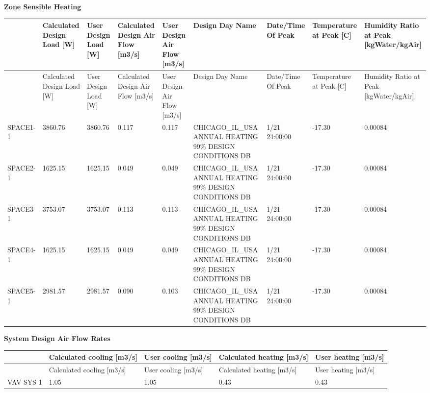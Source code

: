 \textbf{Zone Sensible Heating}

{\scriptsize
\begin{longtable}[c]{>{\raggedright}p{0.66in}>{\raggedright}p{0.66in}>{\raggedright}p{0.66in}>{\raggedright}p{0.66in}>{\raggedright}p{0.66in}>{\raggedright}p{0.66in}>{\raggedright}p{0.66in}>{\raggedright}p{0.66in}>{\raggedright}p{0.66in}}
\toprule 
 & Calculated Design Load [W] & User Design Load [W] & Calculated Design Air Flow [m3/s] & User Design Air Flow [m3/s] & Design Day Name & Date/Time Of Peak & Temperature at Peak [C] & Humidity Ratio at Peak [kgWater/kgAir] \tabularnewline
\midrule
\endfirsthead

\toprule 
 & Calculated Design Load [W] & User Design Load [W] & Calculated Design Air Flow [m3/s] & User Design Air Flow [m3/s] & Design Day Name & Date/Time Of Peak & Temperature at Peak [C] & Humidity Ratio at Peak [kgWater/kgAir] \tabularnewline
\midrule
\endhead

SPACE1-1 & 3860.76 & 3860.76 & 0.117 & 0.117 & CHICAGO\-\_IL\-\_USA ANNUAL HEATING 99\% DESIGN CONDITIONS DB & 1/21 24:00:00 & -17.30 & 0.00084 \tabularnewline
SPACE2-1 & 1625.15 & 1625.15 & 0.049 & 0.049 & CHICAGO\-\_IL\-\_USA ANNUAL HEATING 99\% DESIGN CONDITIONS DB & 1/21 24:00:00 & -17.30 & 0.00084 \tabularnewline
SPACE3-1 & 3753.07 & 3753.07 & 0.113 & 0.113 & CHICAGO\-\_IL\-\_USA ANNUAL HEATING 99\% DESIGN CONDITIONS DB & 1/21 24:00:00 & -17.30 & 0.00084 \tabularnewline
SPACE4-1 & 1625.15 & 1625.15 & 0.049 & 0.049 & CHICAGO\-\_IL\-\_USA ANNUAL HEATING 99\% DESIGN CONDITIONS DB & 1/21 24:00:00 & -17.30 & 0.00084 \tabularnewline
SPACE5-1 & 2981.57 & 2981.57 & 0.090 & 0.103 & CHICAGO\-\_IL\-\_USA ANNUAL HEATING 99\% DESIGN CONDITIONS DB & 1/21 24:00:00 & -17.30 & 0.00084 \tabularnewline
\bottomrule
\end{longtable}}

\textbf{System Design Air Flow Rates}

\begin{longtable}[c]{>{\raggedright}p{1.2in}>{\raggedright}p{1.2in}>{\raggedright}p{1.2in}>{\raggedright}p{1.2in}>{\raggedright}p{1.2in}}
\toprule 
 & Calculated cooling [m3/s] & User cooling [m3/s] & Calculated heating [m3/s] & User heating [m3/s] \tabularnewline
\midrule
\endfirsthead

\toprule 
 & Calculated cooling [m3/s] & User cooling [m3/s] & Calculated heating [m3/s] & User heating [m3/s] \tabularnewline
\midrule
\endhead

VAV SYS 1 & 1.05 & 1.05 & 0.43 & 0.43 \tabularnewline
\bottomrule
\end{longtable}

